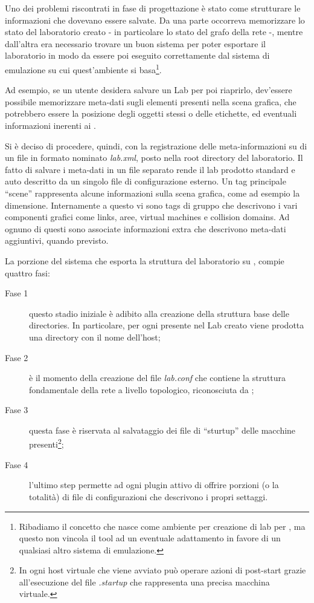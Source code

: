 Uno dei problemi riscontrati in fase di progettazione è stato come strutturare le informazioni che dovevano essere salvate. Da una parte occorreva memorizzare lo stato del laboratorio creato - in particolare lo stato del grafo della rete -, mentre dall'altra era necessario trovare un buon sistema per poter esportare il laboratorio in modo da essere poi eseguito correttamente dal sistema di emulazione su cui quest'ambiente si basa\footnote{Ribadiamo il concetto che \visualnetkit{} nasce come ambiente per creazione di lab per \netkit{}, ma questo non vincola il tool ad un eventuale adattamento in favore di un qualsiasi altro sistema di emulazione.}.

Ad esempio, se un utente desidera salvare un Lab per poi riaprirlo, dev'essere possibile memorizzare meta-dati sugli elementi presenti nella scena grafica, che potrebbero essere la posizione degli oggetti stessi o delle etichette, ed eventuali informazioni inerenti ai \plugin{}.

Si è deciso di procedere, quindi, con la registrazione delle meta-informazioni su di un file in formato \xml{} nominato \emph{lab.xml}, posto nella root directory del laboratorio.
Il fatto di salvare i meta-dati in un file separato rende il lab prodotto standard e auto descritto da un singolo file di configurazione esterno.
Un tag principale ``scene'' rappresenta alcune informazioni sulla scena grafica, come ad esempio la dimensione. Internamente a questo vi sono tags di gruppo che descrivono i vari componenti grafici come links, aree, virtual machines e collision domains. Ad ognuno di questi sono associate informazioni extra che descrivono meta-dati aggiuntivi, quando previsto.

La porzione del sistema che esporta la struttura del laboratorio su \fs{}, compie quattro fasi:
\begin{description}
\item[Fase 1] questo stadio iniziale è adibito alla creazione della struttura base delle directories. In particolare, per ogni \virtualmachine{} presente nel Lab creato viene prodotta una directory con il nome dell'host;

\item[Fase 2] è il momento della creazione del file \emph{lab.conf} che contiene la struttura fondamentale della rete a livello topologico, riconosciuta da \netkit{};

\item[Fase 3] questa fase è riservata al salvataggio dei file di ``sturtup'' delle macchine presenti\footnote{In \netkit{} ogni host virtuale che viene avviato può operare azioni di post-start grazie all'esecuzione del file \emph{.startup} che rappresenta una precisa macchina virtuale.};

\item[Fase 4] l'ultimo step permette ad ogni plugin attivo di offrire porzioni (o la totalità) di file di configurazioni che descrivono i propri settaggi.
\end{description}

